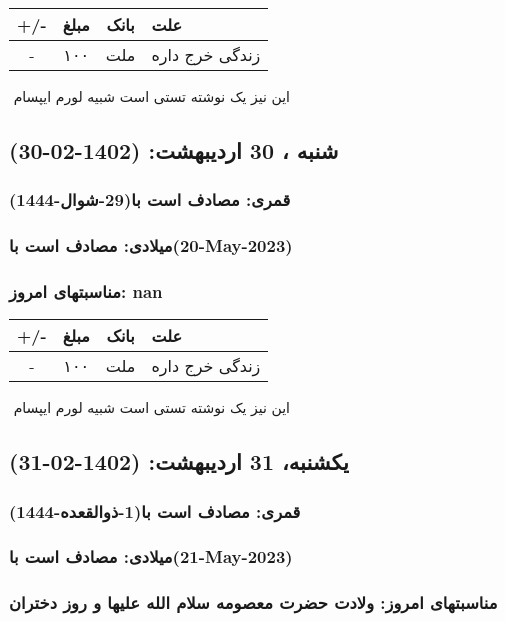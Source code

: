 \documentclass{article}
\newcommand{\rnote}[1]{\marginpar{\textcolor{color}{\StrSubstitute{\##1}{ }{\_}}}}
\newcommand{\myRow}[4]{
    #1 & #2 & #3 & #4 \\ \hline
}
\begin{document}
\begin{tabular}{ | c | c | c | p{5cm} |}
    \hline
    \myRow{ +/- }{مبلغ}{بانک}{علت}
    \myRow{-}{۱۰۰}{ملت}{زندگی خرج داره}
\end{tabular}
\newline
\newline

‌
\rnote{تست}
این نیز یک نوشته تستی است شبیه لورم ایپسام




\newpage
{}
\textcolor{color}{
\section{ شنبه ، 30 اردیبهشت: (1402-02-30) }
\subsubsection*{قمری: مصادف است با(29-شوال-1444)} 
\subsubsection*{میلادی: مصادف است با(20-May-2023)}
\subsubsection*{مناسبتهای امروز: nan}
}


\begin{tabular}{ | c | c | c | p{5cm} |}
    \hline
    \myRow{ +/- }{مبلغ}{بانک}{علت}
    \myRow{-}{۱۰۰}{ملت}{زندگی خرج داره}
\end{tabular}
\newline
\newline

‌
\rnote{تست}
این نیز یک نوشته تستی است شبیه لورم ایپسام




\newpage
{}
\textcolor{color}{
\section{ یکشنبه، 31 اردیبهشت: (1402-02-31) }
\subsubsection*{قمری: مصادف است با(1-ذوالقعده-1444)} 
\subsubsection*{میلادی: مصادف است با(21-May-2023)}
\subsubsection*{مناسبتهای امروز: ولادت حضرت معصومه سلام الله علیها و روز دختران}
}
\end{document}
